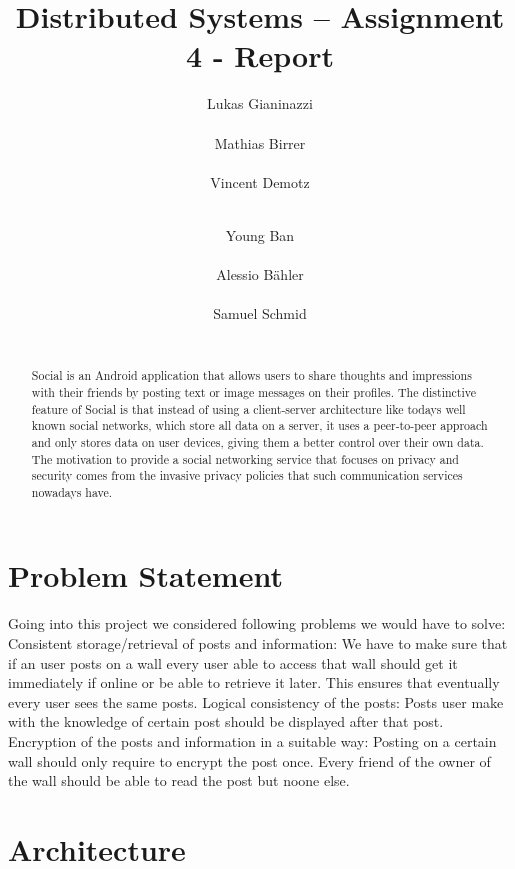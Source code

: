 \documentclass{report}
\title{Distributed Systems -- Assignment 4 - Report}
\author{
%
%
\alignauthor Lukas Gianinazzi\\
	\affaddr{ETH ID 11-719-143}\\
	\email{glukas@student.ethz.ch}
\alignauthor Mathias Birrer\\
	\affaddr{ETH ID 11-921-129}\\
	\email{matbirre@student.ethz.ch}
\alignauthor Vincent Demotz\\
	\affaddr{ETH ID 12-929-188}\\
	\email{vdemotz@student.ethz.ch}
\and  %
\alignauthor Young Ban\\
 	\affaddr{ETH ID 10-935-062}\\
 	\email{bany@student.ethz.ch}
\alignauthor Alessio Bähler\\
 	\affaddr{ETH ID XX-XXX-XXX}\\
 	\email{abaehler@student.ethz.ch}
\alignauthor Samuel Schmid\\
 	\affaddr{ETH ID 10-919-991}\\
 	\email{schmisam@student.ethz.ch}
}
\begin{document}
\maketitle

\begin{abstract}
Social is an Android application that allows users to share thoughts and impressions with their friends by posting text or image messages on their profiles.
The distinctive feature of Social is that instead of using a client-server architecture like todays well known social networks, which store all data on a server, it uses a peer-to-peer approach and only stores data on user devices, giving them a better control over their own data.
The motivation to provide a social networking service that focuses on privacy and security comes from the invasive privacy policies that such communication services nowadays have.
\end{abstract}

\section{Problem Statement}

Going into this project we considered following problems we would have to solve: \newline
Consistent storage/retrieval of posts and information:  \newline
We have to make sure that if an user posts on a wall every user able to access that wall should get it immediately if online or be able to retrieve it later. This ensures that eventually every user sees the same posts.  \newline
Logical consistency of the posts:  \newline
Posts user make with the knowledge of certain post should be displayed after that post.  \newline
Encryption of the posts and information in a suitable way:  \newline
Posting on a certain wall should only require to encrypt the post once. Every friend of the owner of the wall should be able to read the post but noone else. \newline


\section{Architecture}
\end{document}
